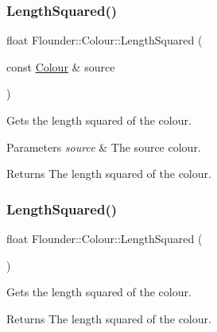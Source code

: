 \subsubsection{\texorpdfstring{Length\+Squared()}{LengthSquared()}\hspace{0.1cm}{\footnotesize\ttfamily [1/2]}}
{\footnotesize\ttfamily float Flounder\+::\+Colour\+::\+Length\+Squared (\begin{DoxyParamCaption}\item[{const \hyperlink{class_flounder_1_1_colour}{Colour} \&}]{source }\end{DoxyParamCaption})\hspace{0.3cm}{\ttfamily [static]}}



Gets the length squared of the colour. 


\begin{DoxyParams}{Parameters}
{\em source} & The source colour. \\
\hline
\end{DoxyParams}
\begin{DoxyReturn}{Returns}
The length squared of the colour. 
\end{DoxyReturn}
\mbox{\label{class_flounder_1_1_colour_a4bc77aaec8c0018d8fd210558bc5728a}} 
\subsubsection{\texorpdfstring{Length\+Squared()}{LengthSquared()}\hspace{0.1cm}{\footnotesize\ttfamily [2/2]}}
{\footnotesize\ttfamily float Flounder\+::\+Colour\+::\+Length\+Squared (\begin{DoxyParamCaption}{ }\end{DoxyParamCaption})}



Gets the length squared of the colour. 

\begin{DoxyReturn}{Returns}
The length squared of the colour. 
\end{DoxyReturn}
\mbox{\label{class_flounder_1_1_colour_ad07bbfc4a5c56a37adaf99947c88c71b}} 
